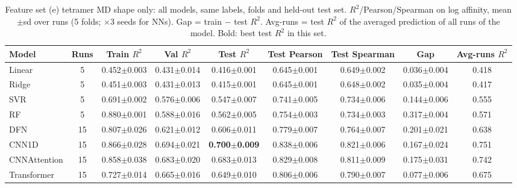 \begin{table}[H]\centering\scriptsize\setlength{\tabcolsep}{3pt}
\caption{Feature set (e) tetramer MD shape only: all models, same labels, folds and held-out test set. $R^2$/Pearson/Spearman on log affinity, mean$\pm$sd over runs (5 folds; $\times$3 seeds for NNs). Gap = train $-$ test $R^2$. Avg-runs = test $R^2$ of the averaged prediction of all runs of the model. Bold: best test $R^2$ in this set.}
\begin{tabular}{lcccccccc}\toprule
Model & Runs & Train $R^2$ & Val $R^2$ & Test $R^2$ & Test Pearson & Test Spearman & Gap & Avg-runs $R^2$\\\midrule
Linear & 5 & 0.452$\pm$0.003 & 0.431$\pm$0.014 & 0.416$\pm$0.001 & 0.645$\pm$0.001 & 0.649$\pm$0.002 & 0.036$\pm$0.004 & 0.418 \\
Ridge & 5 & 0.451$\pm$0.003 & 0.431$\pm$0.013 & 0.415$\pm$0.001 & 0.645$\pm$0.001 & 0.648$\pm$0.002 & 0.035$\pm$0.004 & 0.417 \\
SVR & 5 & 0.691$\pm$0.002 & 0.576$\pm$0.006 & 0.547$\pm$0.007 & 0.741$\pm$0.005 & 0.734$\pm$0.006 & 0.144$\pm$0.006 & 0.555 \\
RF & 5 & 0.880$\pm$0.001 & 0.588$\pm$0.016 & 0.562$\pm$0.005 & 0.754$\pm$0.003 & 0.734$\pm$0.003 & 0.317$\pm$0.004 & 0.571 \\
DFN & 15 & 0.807$\pm$0.026 & 0.621$\pm$0.012 & 0.606$\pm$0.011 & 0.779$\pm$0.007 & 0.764$\pm$0.007 & 0.201$\pm$0.021 & 0.638 \\
CNN1D & 15 & 0.866$\pm$0.028 & 0.694$\pm$0.021 & \textbf{0.700$\pm$0.009} & 0.838$\pm$0.006 & 0.821$\pm$0.006 & 0.167$\pm$0.024 & 0.751 \\
CNNAttention & 15 & 0.858$\pm$0.038 & 0.683$\pm$0.020 & 0.683$\pm$0.013 & 0.829$\pm$0.008 & 0.811$\pm$0.009 & 0.175$\pm$0.031 & 0.742 \\
Transformer & 15 & 0.727$\pm$0.014 & 0.665$\pm$0.016 & 0.649$\pm$0.010 & 0.806$\pm$0.006 & 0.790$\pm$0.007 & 0.077$\pm$0.006 & 0.675 \\
\bottomrule\end{tabular}\label{tab:fs_tetramerMD}\end{table}

